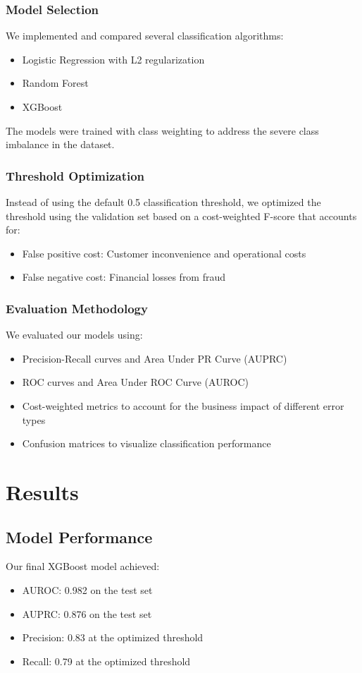 \documentclass{article}
\begin{document}
\subsubsection{Model Selection}
We implemented and compared several classification algorithms:
\begin{itemize}
    \item Logistic Regression with L2 regularization
    \item Random Forest
    \item XGBoost
\end{itemize}

The models were trained with class weighting to address the severe class imbalance in the dataset.

\subsubsection{Threshold Optimization}
Instead of using the default 0.5 classification threshold, we optimized the threshold using the validation set based on a cost-weighted F-score that accounts for:
\begin{itemize}
    \item False positive cost: Customer inconvenience and operational costs
    \item False negative cost: Financial losses from fraud
\end{itemize}

\subsubsection{Evaluation Methodology}
We evaluated our models using:
\begin{itemize}
    \item Precision-Recall curves and Area Under PR Curve (AUPRC)
    \item ROC curves and Area Under ROC Curve (AUROC)
    \item Cost-weighted metrics to account for the business impact of different error types
    \item Confusion matrices to visualize classification performance
\end{itemize}

\section{Results}
\subsection{Model Performance}
Our final XGBoost model achieved:
\begin{itemize}
    \item AUROC: 0.982 on the test set
    \item AUPRC: 0.876 on the test set
    \item Precision: 0.83 at the optimized threshold
    \item Recall: 0.79 at the optimized threshold
\end{itemize}
\end{document}
